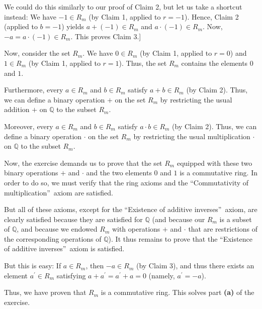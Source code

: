 \documentclass[paper=a4, fontsize=12pt]{scrartcl}%
\theoremstyle{plainsl}
\theoremstyle{definition}
\theoremstyle{remark}
\begin{document}
We could do this similarly to our proof of Claim 2, but let us take a shortcut
instead: We have $-1\in R_{m}$ (by Claim 1, applied to $r=-1$). Hence, Claim 2
(applied to $b=-1$) yields $a+\left(  -1\right)  \in R_{m}$ and $a\cdot\left(
-1\right)  \in R_{m}$. Now, $-a=a\cdot\left(  -1\right)  \in R_{m}$. This
proves Claim 3.]

Now, consider the set $R_{m}$. We have $0\in R_{m}$ (by Claim 1, applied to
$r=0$) and $1\in R_{m}$ (by Claim 1, applied to $r=1$). Thus, the set $R_{m}$
contains the elements $0$ and $1$.

Furthermore, every $a\in R_{m}$ and $b\in R_{m}$ satisfy $a+b\in R_{m}$ (by
Claim 2). Thus, we can define a binary operation $+$ on the set $R_{m}$ by
restricting the usual addition $+$ on $\mathbb{Q}$ to the subset $R_{m}$.

Moreover, every $a\in R_{m}$ and $b\in R_{m}$ satisfy $a\cdot b\in R_{m}$ (by
Claim 2). Thus, we can define a binary operation $\cdot$ on the set $R_{m}$ by
restricting the usual multiplication $\cdot$ on $\mathbb{Q}$ to the subset
$R_{m}$.

Now, the exercise demands us to prove that the set $R_{m}$ equipped with these
two binary operations $+$ and $\cdot$ and the two elements $0$ and $1$ is a
commutative ring. In order to do so, we must verify that the ring axioms and
the \textquotedblleft Commutativity of multiplication\textquotedblright\ axiom
are satisfied.

But all of these axioms, except for the \textquotedblleft Existence of
additive inverses\textquotedblright\ axiom, are clearly satisfied because they
are satisfied for $\mathbb{Q}$ (and because our $R_{m}$ is a subset of
$\mathbb{Q}$, and because we endowed $R_{m}$ with operations $+$ and $\cdot$
that are restrictions of the corresponding operations of $\mathbb{Q}$). It
thus remains to prove that the \textquotedblleft Existence of additive
inverses\textquotedblright\ axiom is satisfied.

But this is easy: If $a\in R_{m}$, then $-a\in R_{m}$ (by Claim 3), and thus
there exists an element $a^{\prime}\in R_{m}$ satisfying $a+a^{\prime
}=a^{\prime}+a=0$ (namely, $a^{\prime}=-a$).

Thus, we have proven that $R_{m}$ is a commutative ring. This solves part
\textbf{(a)} of the exercise.

\bigskip
\end{document}
